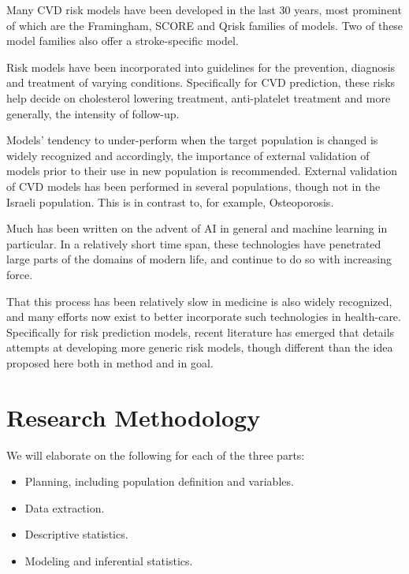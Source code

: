\documentclass[a4paper,12pt]{article}
\begin{document}
	Many CVD risk models have been developed in the last 30 years, most prominent of which are the Framingham\cite{Wilson1998,NationalCholesterolEducationProgramNCEPExpertPanelonDetection2002,DAgostino2008,Goff2014}, SCORE\cite{Conroy2003} and Qrisk\cite{Hippisley-Cox2007,Hippisley-Cox2008} families of models.	Two of these model families also offer a stroke-specific model\cite{Wolf1991,DAgostino1994,Hippisley-Cox2013}.
	
	Risk models have been incorporated into guidelines for the prevention, diagnosis and treatment of varying conditions. Specifically for CVD prediction, these risks help decide on cholesterol lowering treatment, anti-platelet treatment and more generally, the intensity of follow-up\cite{NationalCholesterolEducationProgramNCEPExpertPanelonDetection2002,Graham2007,Goff2014,Bibbins-Domingo2016}.
	
	Models' tendency to under-perform when the target population is changed is widely recognized\cite{DAgostino2001,Bastuji-Garin2002,DeFilippis2015} and accordingly, the importance of external validation of models prior to their use in new population is recommended\cite{Moons2012}. External validation of CVD models has been performed in several populations\cite{DAgostino2001,Bastuji-Garin2002,DeFilippis2015}, though not in the Israeli population\cite{Bitzur2015}. This is in contrast to, for example, Osteoporosis\cite{Dagan2017}.
	
	Much has been written on the advent of AI in general and machine learning in particular. In a relatively short time span, these technologies have penetrated large parts of the domains of modern life, and continue to do so with increasing force\cite{Ng2017}.
	
	That this process has been relatively slow in medicine is also widely recognized, and many efforts now exist to better incorporate such technologies in health-care\cite{Obermeyer2016}. Specifically for risk prediction models, recent literature has emerged that details attempts at developing more generic risk models, though different than the idea proposed here both in method and in goal\cite{Rajkomar2018}.
	
	\section{Research Methodology}
	We will elaborate on the following for each of the three parts:
	\begin{itemize}
		\item Planning, including population definition and variables.
		\item Data extraction.
		\item Descriptive statistics.
		\item Modeling and inferential statistics.
	\end{itemize}
\end{document}
